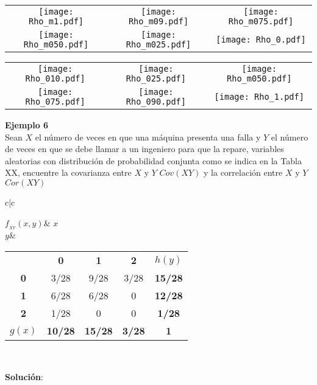\documentclass[base=hide,12pt]{elegantbook}
\begin{document}
\begin{center}
\begin{tabular}{ccc}
\texttt{[image: Rho\_m1.pdf]} & 
\texttt{[image: Rho\_m09.pdf]} &
\texttt{[image: Rho\_m075.pdf]} \\  

\texttt{[image: Rho\_m050.pdf]} & 
\texttt{[image: Rho\_m025.pdf]} &
\texttt{[image: Rho\_0.pdf]} \\
\end{tabular}	
\end{center}

\begin{center}
	\begin{tabular}{ccc}
\texttt{[image: Rho\_010.pdf]} & 
\texttt{[image: Rho\_025.pdf]} &
\texttt{[image: Rho\_m050.pdf]} \\


\texttt{[image: Rho\_075.pdf]} & 
\texttt{[image: Rho\_090.pdf]} &
\texttt{[image: Rho\_1.pdf]} \\
  
\end{tabular}	
\end{center}


%

\textcolor{col3}{\bf \large Ejemplo 6}\\
 Sean $X$ el  número de veces en que una  máquina presenta una falla  y $Y$ el número de veces en que se debe llamar a un ingeniero para que la repare, variables aleatorias con distribución de probabilidad conjunta como se indica en la Tabla  XX, encuentre la covarianza entre $X$ y $Y$ $Cov(XY)$ y la correlación  entre $X$ y $Y$ $Cor(XY)$ 


\begin{center}
	\begin{tabular}{c|c}
		
		$f_{_{XY}}(x,y)$& \textcolor{col5}{\bf $x$} \\	
		\hline 
		\textcolor{col4}{\bf $y$}&	
		\begin{tabular}{ccccc}
			& \textcolor{col5}{\bf 0}   & \textcolor{col5}{\bf 1}    & \textcolor{col5}{\bf 2} &  \textcolor{col4}{\bf $h(y)$}\\	 
			\textcolor{col4}{\bf 0}& 3/28 & 9/28 & 3/28  & 	\textcolor{col4}{\bf15/28}\\
			\textcolor{col4}{\bf 1}&6/28 & 6/28 & 0  & 	\textcolor{col4}{\bf 12/28}\\
			\textcolor{col4}{\bf 2}&1/28 & 0 & 0  &  	\textcolor{col4}{\bf 1/28}\\
			\textcolor{col5}{\bf $g(x)$}& 	\textcolor{col5}{\bf10/28} & 	\textcolor{col5}{\bf 15/28} & 	\textcolor{col5}{\bf 3/28} & {\bf 1 }\\
		\end{tabular}	
		\\
	\end{tabular}	
\end{center}
%
\textcolor{col3}{\bf \large Solución}: \\
\end{document}
